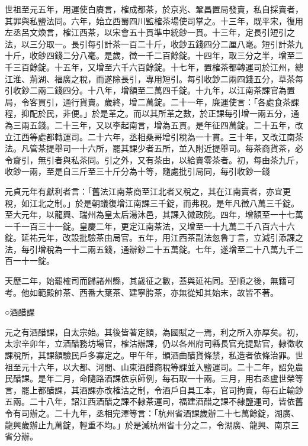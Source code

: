 \begin{pinyinscope}
 世祖至元五年，用運使白賡言，榷成都茶，於京兆、鞏昌置局發賣，私自採賣者，其罪與私鹽法同。六年，始立西蜀四川監榷茶場使司掌之。十三年，既平宋，復用左丞呂文煥言，榷江西茶，以宋會五十貫準中統鈔一貫。十三年，定長引短引之法，以三分取一。長引每引計茶一百二十斤，收鈔五錢四分二厘八毫。短引計茶九十斤，收鈔四錢二分八毫。是歲，徵一千二百餘錠。十四年，取三分之半，增至二千三百餘錠。十五年，又增至六千六百餘錠。十七年，置榷茶都轉運司於江州，總江淮、荊湖、福廣之稅，而遂除長引，專用短引。每引收鈔二兩四錢五分，草茶每引收鈔二兩二錢四分。十八年，增額至二萬四千錠。十九年，以江南茶課官為置局，令客買引，通行貨賣。歲終，增二萬錠。二十一年，廉運使言：「各處食茶課程，抑配於民，非便。」於是革之。而以其所革之數，於正課每引增一兩五分，通為三兩五錢。二十三年，又以李起南言，增為五貫。是年征四萬錠。二十五年，改立江西等處都轉運司。二十六年，丞相桑哥增引稅為一十貫。三十年，又改江南茶法。凡管茶提舉司一十六所，罷其課少者五所，並入附近提舉司。每茶商貨茶，必令齎引，無引者與私茶同。引之外，又有茶由，以給賣零茶者。初，每由茶九斤，收鈔一兩，至是自三斤至三十斤分為十等，隨處批引局同，每引收鈔一錢



 元貞元年有獻利者言：「舊法江南茶商至江北者又稅之，其在江南賣者，亦宜更稅，如江北之制。」於是朝議復增江南課三千錠，而弗稅。是年凡徵八萬三千錠。至大元年，以龍興、瑞州為皇太后湯沐邑，其課入徽政院。四年，增額至一十七萬一千一百三十一錠。皇慶二年，更定江南茶法，又增至一十九萬二千八百六十六錠。延祐元年，改設批驗茶由局官。五年，用江西茶副法忽魯丁言，立減引添課之法，每引增稅為一十二兩五錢，通辦鈔二十五萬錠。七年，遂增至二十八萬九千二百一十一錠。



 天歷二年，始罷榷司而歸諸州縣，其歲征之數，蓋與延祐同。至順之後，無籍可考。他如範殿帥茶、西番大葉茶、建寧胯茶，亦無從知其始末，故皆不著。



 ○酒醋課



 元之有酒醋課，自太宗始。其後皆著定額，為國賦之一焉，利之所入亦厚矣。初，太宗辛卯年，立酒醋務坊場官，榷沽辦課，仍以各州府司縣長官充提點官，隸徵收課稅所，其課額驗民戶多寡定之。甲午年，頒酒曲醋貨條禁，私造者依條治罪。世祖至元十六年，以大都、河間、山東酒醋商稅等課並入鹽運司。二十二年，詔免農民醋課。是年二月，命隨路酒課依京師例，每石取一十兩。三月，用右丞盧世榮等言，罷上都醋課，其酒課亦改榷沽之制，令酒戶自具工本，官司拘賣，每石止輸鈔五兩。二十八年，詔江西酒醋之課不隸茶運司，福建酒醋之課不隸鹽運司，皆依舊令有司辦之。二十九年，丞相完澤等言：「杭州省酒課歲辦二十七萬餘錠，湖廣、龍興歲辦止九萬錠，輕重不均。」於是減杭州省十分之二，令湖廣、龍興、南京三省分辦。




\end{pinyinscope}
